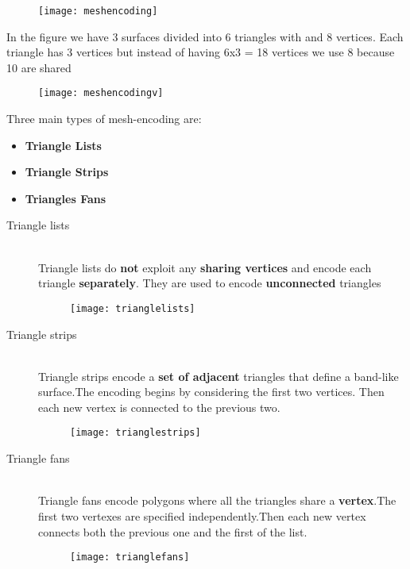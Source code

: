 \begin{figure}[H]
  \centering
  \texttt{[image: meshencoding]}
\end{figure}
In the figure we have 3 surfaces divided into 6 triangles with and 8 vertices.
Each triangle has 3 vertices but instead of having 6x3 = 18 vertices we use 8 because 10 are shared
\begin{figure}[H]
  \centering
  \texttt{[image: meshencodingv]}
\end{figure}

Three main types of mesh-encoding are:
\begin{itemize}
\item \textbf{Triangle Lists}
\item\textbf{ Triangle Strips}
\item \textbf{Triangles Fans}
\end{itemize}

\begin{description}
\item[Triangle lists]\hfill\\ 
Triangle lists do \textbf{not} exploit any \textbf{sharing vertices} and encode each triangle \textbf{separately}. They are used to encode \textbf{unconnected} triangles
\begin{figure}[H]
  \centering
  \texttt{[image: trianglelists]}
\end{figure}

\item[Triangle strips]\hfill\\
Triangle strips encode a \textbf{set of adjacent} triangles that define a band-like surface.The encoding begins by considering the first two vertices. Then each new vertex is connected to the previous two.
\begin{figure}[H]
  \centering
  \texttt{[image: trianglestrips]}
\end{figure}

\item[Triangle fans]\hfill\\
Triangle fans encode polygons where all the triangles share a \textbf{vertex}.The first two vertexes are specified independently.Then each new vertex connects both the previous one and the first of the list.
\begin{figure}[H]
  \centering
  \texttt{[image: trianglefans]}
\end{figure}
\end{description}


